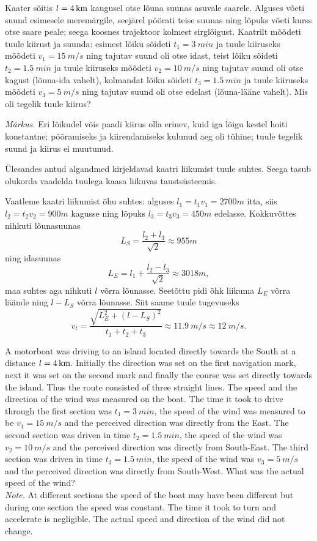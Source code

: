 
Kaater sõitis $l=\SI 4{km}$ kaugusel otse lõuna suunas asuvale saarele. 
Alguses võeti suund esimesele meremärgile, seejärel pöörati teise suunas ning lõpuks võeti kurss otse saare peale; seega koosnes trajektoor kolmest sirglõigust. Kaatrilt mõõdeti tuule kiirust ja suunda: esimest lõiku sõideti $t_1=\SI{3}{min}$ ja tuule kiiruseks mõõdeti $v_1=\SI{15}{m/s}$ ning tajutav suund oli otse idast, teist lõiku sõideti $t_2=\SI{1,5}{min}$ ja tuule kiiruseks mõõdeti $v_2=\SI{10}{m/s}$ ning tajutav suund oli otse kagust (lõuna-ida vahelt), kolmandat lõiku sõideti $t_3=\SI{1,5}{min}$ ja tuule kiiruseks mõõdeti $v_3=\SI{5}{m/s}$ ning tajutav suund oli otse edelast (lõuna-lääne vahelt). Mis oli tegelik tuule kiirus?

\emph{Märkus.} Eri lõikudel võis paadi kiirus olla erinev, kuid iga lõigu kestel hoiti konstantne; pööramiseks ja kiirendamiseks kulunud aeg oli tühine; tuule tegelik suund ja kiirus ei muutunud. 

\hint
Ülesandes antud algandmed kirjeldavad kaatri liikumist tuule suhtes. Seega tasub olukorda vaadelda tuulega kaasa liikuvas taustsüsteemis.

\solu
Vaatleme kaatri liikumist õhu suhtes: alguses $l_1=t_1v_1=\SI{2700}m$ itta, siis $l_2=t_2v_2=\SI{900}m$ kagusse
ning lõpuks $l_3=t_3v_3=\SI{450}m$ edelasse. Kokkuvõttes nihkuti lõunasuunas 
\[
L_S=\frac{l_2+l_3}{\sqrt 2}\approx \SI{955}m
\]
ning idasuunas
\[
L_E=l_1+\frac{l_2-l_3}{\sqrt 2}\approx \SI{3018}m,
\]
maa suhtes aga nihkuti $l$ võrra lõunasse. Seetõttu pidi õhk liikuma $L_E$ võrra läände ning $l-L_S$ võrra lõunasse. Siit saame tuule tugevuseks 
$$v_t=\frac{\sqrt{L_E^2+(l-L_S)^2}}{t_1+t_2+t_3}\approx \SI{11.9}{m/s}\approx \SI{12}{m/s}.$$ 

A motorboat was driving to an island located directly towards the South at a distance $l=\SI 4{km}$. Initially the direction was set on the first navigation mark, next it was set on the second mark and finally the course was set directly towards the island. Thus the route consisted of three straight lines. The speed and the direction of the wind was measured on the boat. The time it took to drive through the first section was $t_1=\SI{3}{min}$, the speed of the wind was measured to be $v_1=\SI{15}{m/s}$ and the perceived direction was directly from the East. The second section was driven in time $t_2=\SI{1,5}{min}$, the speed of the wind was $v_2=\SI{10}{m/s}$ and the perceived direction was directly from South-East. The third section was driven in time $t_3=\SI{1,5}{min}$, the speed of the wind was $v_3=\SI{5}{m/s}$ and the perceived direction was directly from South-West. What was the actual speed of the wind?\\
\emph{Note.} At different sections the speed of the boat may have been different but during one section the speed was constant. The time it took to turn and accelerate is negligible. The actual speed and direction of the wind did not change.

